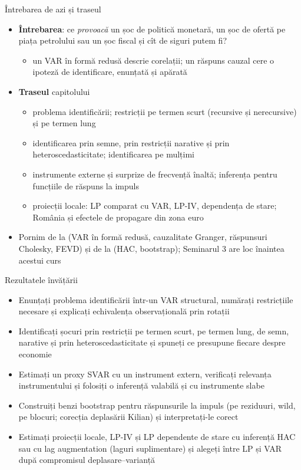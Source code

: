 \begin{frame}{Întrebarea de azi și traseul}
\itemsize{\small}
\begin{itemize}
    \item \textbf{Întrebarea}: ce \emph{provoacă} un șoc de politică monetară, un șoc de ofertă pe piața petrolului sau un șoc fiscal și cît de siguri putem fi?
    \begin{itemize}
        \item un VAR în formă redusă descrie corelații; un răspuns cauzal cere o ipoteză de identificare, enunțată și apărată
    \end{itemize}
    \item \textbf{Traseul} capitolului
    \begin{itemize}
        \item problema identificării; restricții pe termen scurt (recursive și nerecursive) și pe termen lung
        \item identificarea prin semne, prin restricții narative și prin heteroscedasticitate; identificarea pe mulțimi
        \item instrumente externe și surprize de frecvență înaltă; inferența pentru funcțiile de răspuns la impuls
        \item proiecții locale: LP comparat cu VAR, LP-IV, dependența de stare; România și efectele de propagare din zona euro
    \end{itemize}
    \item Pornim de la  (VAR în formă redusă, cauzalitate Granger, răspunsuri Cholesky, FEVD) și de la  (HAC, bootstrap); Seminarul 3 are loc înaintea acestui curs
\end{itemize}
\end{frame}

\begin{frame}{Rezultatele învățării}
\itemsize{\small}
\begin{itemize}
    \item Enunțați problema identificării într-un VAR structural, numărați restricțiile necesare și explicați echivalența observațională prin rotații
    \item Identificați șocuri prin restricții pe termen scurt, pe termen lung, de semn, narative și prin heteroscedasticitate și spuneți ce presupune fiecare despre economie
    \item Estimați un proxy SVAR cu un instrument extern, verificați relevanța instrumentului și folosiți o inferență valabilă și cu instrumente slabe
    \item Construiți benzi bootstrap pentru răspunsurile la impuls (pe reziduuri, wild, pe blocuri; corecția deplasării Kilian) și interpretați-le corect
    \item Estimați proiecții locale, LP-IV și LP dependente de stare cu inferență HAC sau cu lag augmentation (laguri suplimentare) și alegeți între LP și VAR după compromisul deplasare--varianță
\end{itemize}
\end{frame}

